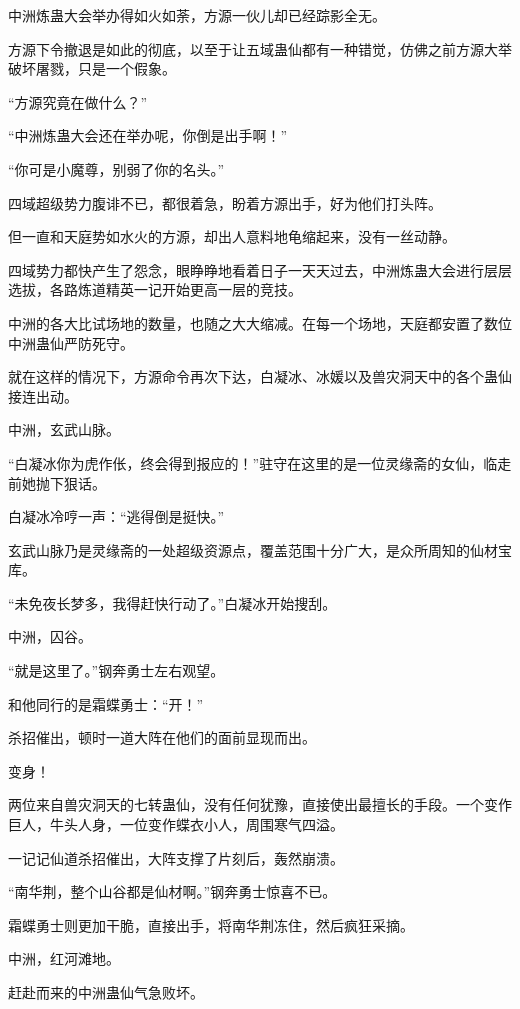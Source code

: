 
\begin{this_body}

中洲炼蛊大会举办得如火如荼，方源一伙儿却已经踪影全无。

方源下令撤退是如此的彻底，以至于让五域蛊仙都有一种错觉，仿佛之前方源大举破坏屠戮，只是一个假象。

“方源究竟在做什么？”

“中洲炼蛊大会还在举办呢，你倒是出手啊！”

“你可是小魔尊，别弱了你的名头。”

四域超级势力腹诽不已，都很着急，盼着方源出手，好为他们打头阵。

但一直和天庭势如水火的方源，却出人意料地龟缩起来，没有一丝动静。

四域势力都快产生了怨念，眼睁睁地看着日子一天天过去，中洲炼蛊大会进行层层选拔，各路炼道精英一记开始更高一层的竞技。

中洲的各大比试场地的数量，也随之大大缩减。在每一个场地，天庭都安置了数位中洲蛊仙严防死守。

就在这样的情况下，方源命令再次下达，白凝冰、冰媛以及兽灾洞天中的各个蛊仙接连出动。

中洲，玄武山脉。

“白凝冰你为虎作伥，终会得到报应的！”驻守在这里的是一位灵缘斋的女仙，临走前她抛下狠话。

白凝冰冷哼一声：“逃得倒是挺快。”

玄武山脉乃是灵缘斋的一处超级资源点，覆盖范围十分广大，是众所周知的仙材宝库。

“未免夜长梦多，我得赶快行动了。”白凝冰开始搜刮。

中洲，囚谷。

“就是这里了。”钢奔勇士左右观望。

和他同行的是霜蝶勇士：“开！”

杀招催出，顿时一道大阵在他们的面前显现而出。

变身！

两位来自兽灾洞天的七转蛊仙，没有任何犹豫，直接使出最擅长的手段。一个变作巨人，牛头人身，一位变作蝶衣小人，周围寒气四溢。

一记记仙道杀招催出，大阵支撑了片刻后，轰然崩溃。

“南华荆，整个山谷都是仙材啊。”钢奔勇士惊喜不已。

霜蝶勇士则更加干脆，直接出手，将南华荆冻住，然后疯狂采摘。

中洲，红河滩地。

赶赴而来的中洲蛊仙气急败坏。


\end{this_body}
